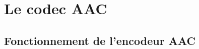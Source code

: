 \documentclass{article}
\begin{document}
    
    
    


    \newpage
    \section{Le codec AAC}
    \label{sec:AAC}
    \subsection{Fonctionnement de l'encodeur AAC}




\end{document}

